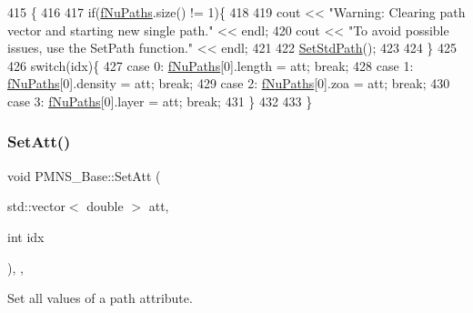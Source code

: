 \begin{DoxyCode}
415                                          \{
416 
417   \textcolor{keywordflow}{if}(\hyperlink{classOscProb_1_1PMNS__Base_a69db9d57e12fc7cbe0431bc6c18fac93}{fNuPaths}.size() != 1)\{
418 
419     cout << \textcolor{stringliteral}{"Warning: Clearing path vector and starting new single path."} << endl;
420     cout << \textcolor{stringliteral}{"To avoid possible issues, use the SetPath function."} << endl;
421 
422     \hyperlink{classOscProb_1_1PMNS__Base_add6533a9fc9acdfc7ae258b62570d78d}{SetStdPath}();
423 
424   \}
425 
426   \textcolor{keywordflow}{switch}(idx)\{
427     \textcolor{keywordflow}{case} 0: \hyperlink{classOscProb_1_1PMNS__Base_a69db9d57e12fc7cbe0431bc6c18fac93}{fNuPaths}[0].length  = att; \textcolor{keywordflow}{break};
428     \textcolor{keywordflow}{case} 1: \hyperlink{classOscProb_1_1PMNS__Base_a69db9d57e12fc7cbe0431bc6c18fac93}{fNuPaths}[0].density = att; \textcolor{keywordflow}{break};
429     \textcolor{keywordflow}{case} 2: \hyperlink{classOscProb_1_1PMNS__Base_a69db9d57e12fc7cbe0431bc6c18fac93}{fNuPaths}[0].zoa     = att; \textcolor{keywordflow}{break};
430     \textcolor{keywordflow}{case} 3: \hyperlink{classOscProb_1_1PMNS__Base_a69db9d57e12fc7cbe0431bc6c18fac93}{fNuPaths}[0].layer   = att; \textcolor{keywordflow}{break};
431   \}
432 
433 \}
\end{DoxyCode}
\mbox{\label{classOscProb_1_1PMNS__Base_aa001479b5f5828c3d16ed087f96ecbcc}} 
\subsubsection{\texorpdfstring{Set\+Att()}{SetAtt()}\hspace{0.1cm}{\footnotesize\ttfamily [2/2]}}
{\footnotesize\ttfamily void P\+M\+N\+S\+\_\+\+Base\+::\+Set\+Att (\begin{DoxyParamCaption}\item[{std\+::vector$<$ double $>$}]{att,  }\item[{int}]{idx }\end{DoxyParamCaption})\hspace{0.3cm}{\ttfamily [protected]}, {\ttfamily [virtual]}, {\ttfamily [inherited]}}

Set all values of a path attribute.

